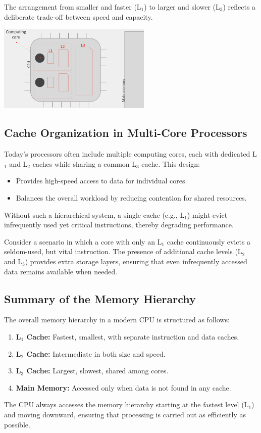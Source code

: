 The arrangement from smaller and faster (L\(_1\)) to larger and slower (L\(_3\)) reflects a deliberate trade-off between speed and capacity.

\begin{center}
  \includegraphics[width=0.55\textwidth]{chapters/L4/images/cpu-cache2.png}
\end{center}

\subsection{Cache Organization in Multi-Core Processors}
Today's processors often include multiple computing cores, each with dedicated L\(_1\) and L\(_2\) caches while sharing a common L\(_3\) cache. This design:
\begin{itemize}
    \item Provides high-speed access to data for individual cores.
    \item Balances the overall workload by reducing contention for shared resources.
\end{itemize}
Without such a hierarchical system, a single cache (e.g., L\(_1\)) might evict infrequently used yet critical instructions, thereby degrading performance.

\begin{example}
Consider a scenario in which a core with only an L\(_1\) cache continuously evicts a seldom-used, but vital instruction. The presence of additional cache levels (L\(_2\) and L\(_3\)) provides extra storage layers, ensuring that even infrequently accessed data remains available when needed.
\end{example}

\subsection{Summary of the Memory Hierarchy}
The overall memory hierarchy in a modern CPU is structured as follows:
\begin{enumerate}
    \item \textbf{L\(_1\) Cache:} Fastest, smallest, with separate instruction and data caches.
    \item \textbf{L\(_2\) Cache:} Intermediate in both size and speed.
    \item \textbf{L\(_3\) Cache:} Largest, slowest, shared among cores.
    \item \textbf{Main Memory:} Accessed only when data is not found in any cache.
\end{enumerate}
The CPU always accesses the memory hierarchy starting at the fastest level (L\(_1\)) and moving downward, ensuring that processing is carried out as efficiently as possible.
